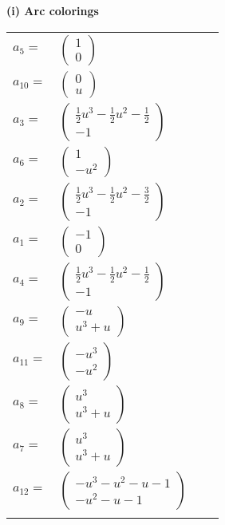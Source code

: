 \documentclass[1p]{elsarticle_modified}
\theoremstyle{definition}
\begin{document}
\flushleft \textbf{(i) Arc colorings}\\
\begin{tabular}{m{7pt} m{180pt} m{7pt} m{180pt} }
\flushright $a_{5}=$&$\begin{pmatrix}1\\0\end{pmatrix}$ \\
\flushright $a_{10}=$&$\begin{pmatrix}0\\u\end{pmatrix}$ \\
\flushright $a_{3}=$&$\begin{pmatrix}\frac{1}{2} u^3-\frac{1}{2} u^2-\frac{1}{2}\\-1\end{pmatrix}$ \\
\flushright $a_{6}=$&$\begin{pmatrix}1\\- u^2\end{pmatrix}$ \\
\flushright $a_{2}=$&$\begin{pmatrix}\frac{1}{2} u^3-\frac{1}{2} u^2-\frac{3}{2}\\-1\end{pmatrix}$ \\
\flushright $a_{1}=$&$\begin{pmatrix}-1\\0\end{pmatrix}$ \\
\flushright $a_{4}=$&$\begin{pmatrix}\frac{1}{2} u^3-\frac{1}{2} u^2-\frac{1}{2}\\-1\end{pmatrix}$ \\
\flushright $a_{9}=$&$\begin{pmatrix}- u\\u^3+u\end{pmatrix}$ \\
\flushright $a_{11}=$&$\begin{pmatrix}- u^3\\- u^2\end{pmatrix}$ \\
\flushright $a_{8}=$&$\begin{pmatrix}u^3\\u^3+u\end{pmatrix}$ \\
\flushright $a_{7}=$&$\begin{pmatrix}u^3\\u^3+u\end{pmatrix}$ \\
\flushright $a_{12}=$&$\begin{pmatrix}- u^3- u^2- u-1\\- u^2- u-1\end{pmatrix}$\\&\end{tabular}
\end{document}
